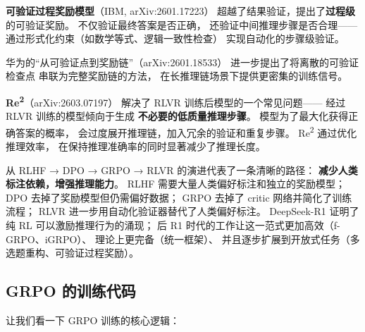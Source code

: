 
\textbf{可验证过程奖励模型}（IBM, arXiv:2601.17223）
超越了结果验证，提出了\textbf{过程级}的可验证奖励。
不仅验证最终答案是否正确，
还验证中间推理步骤是否合理——
通过形式化约束（如数学等式、逻辑一致性检查）
实现自动化的步骤级验证。

华为的``从可验证点到奖励链''（arXiv:2601.18533）
进一步提出了将离散的可验证检查点
串联为完整奖励链的方法，
在长推理链场景下提供更密集的训练信号。


\textbf{Re\textsuperscript{2}}（arXiv:2603.07197）
解决了 RLVR 训练后模型的一个常见问题——
经过 RLVR 训练的模型倾向于生成
\textbf{不必要的低质量推理步骤}。
模型为了最大化获得正确答案的概率，
会过度展开推理链，加入冗余的验证和重复步骤。
Re\textsuperscript{2} 通过优化推理效率，
在保持推理准确率的同时显著减少了推理长度。

\begin{corebox}
从 RLHF → DPO → GRPO → RLVR 的演进代表了一条清晰的路径：
\textbf{减少人类标注依赖，增强推理能力}。
RLHF 需要大量人类偏好标注和独立的奖励模型；
DPO 去掉了奖励模型但仍需偏好数据；
GRPO 去掉了 critic 网络并简化了训练流程；
RLVR 进一步用自动化验证器替代了人类偏好标注。
DeepSeek-R1 证明了纯 RL 可以激励推理行为的涌现；
后 R1 时代的工作让这一范式更加高效（f-GRPO、iGRPO）、
理论上更完备（统一框架）、
并且逐步扩展到开放式任务（多选题重构、可验证过程奖励）。
\end{corebox}

\subsection{GRPO 的训练代码}

让我们看一下 GRPO 训练的核心逻辑：

